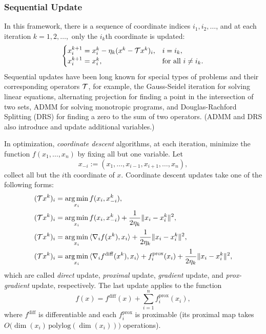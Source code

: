 \subsubsection{Sequential Update} In this framework, there is a sequence of coordinate indices $i_1,i_2,\ldots$, and at each iteration $k=1,2,\ldots,$ only the $i_k$th coordinate is updated:
$$ \begin{cases}
x^{k+1}_{i} = x_{i}^k - \eta_k(x^k-\cT x^k)_{i},& i=i_k,\\
x^{k+1}_{i} = x_i^k,&\text{for all } i\not= i_k.
\end{cases}
$$
Sequential updates have been long known for special types of problems and their corresponding operators ${\mathcal{T}}$, for example, the Gauss-Seidel iteration for solving linear equations, alternating projection \cite{von1949rings,bauschke1993convergence} for finding a point in the intersection of two sets,  ADMM \cite{glowinski1975ADMM, gabay1976ADMM} for solving monotropic programs, and Douglas-Rachford Splitting (DRS) \cite{douglas1956DRS}  for finding a zero to the sum of two operators. (ADMM and DRS also introduce and update additional variables.) 

In optimization,  \emph{coordinate descent} algorithms, at each iteration, minimize the function $f(x_1,\ldots,x_n)$ by fixing all but one variable. Let $$x_{-i}:=(x_1,\ldots,x_{i-1},x_{i+1},\ldots,x_n),$$
collect all but the $i$th coordinate of $x$. Coordinate descent updates take one of the following forms:
\begin{subequations}\label{coordes}
\begin{align}
(\cT x^k)_i & = \argmin_{x_i}f(x_i,x_{-i}^k),\\
(\cT x^k)_i & = \argmin_{x_i}f(x_i,x_{-i}^k)+\frac{1}{2\eta_k}\|x_i-x_i^k\|^2,\\
(\cT x^k)_i & = \argmin_{x_i}\,\langle \nabla_i f(x^k),x_i \rangle+\frac{1}{2\eta_k}\|x_i-x_i^k\|^2,\\
(\cT x^k)_i & = \argmin_{x_i}\,\langle \nabla_i f^{\mathrm{diff}}(x^k),x_i \rangle+f_i^{\mathrm{prox}}(x_i)+\frac{1}{2\eta_k}\|x_i-x_i^k\|^2,
\end{align}
\end{subequations}
which are called \emph{direct} update, \emph{proximal} update,  \emph{gradient} update, and \emph{prox-gradient} update, respectively. The last update applies to the function $$f(x) = f^{\mathrm{diff}}(x)+\sum_{i=1}^nf^{\mathrm{prox}}_i(x_i),$$ where $f^{\mathrm{diff}}$ is differentiable and each $f^{\mathrm{prox}}_i$ is proximable (its proximal map takes $O\big(\dim(x_i)\,\mathrm{polylog}(\dim(x_i))\big)$ operations).

